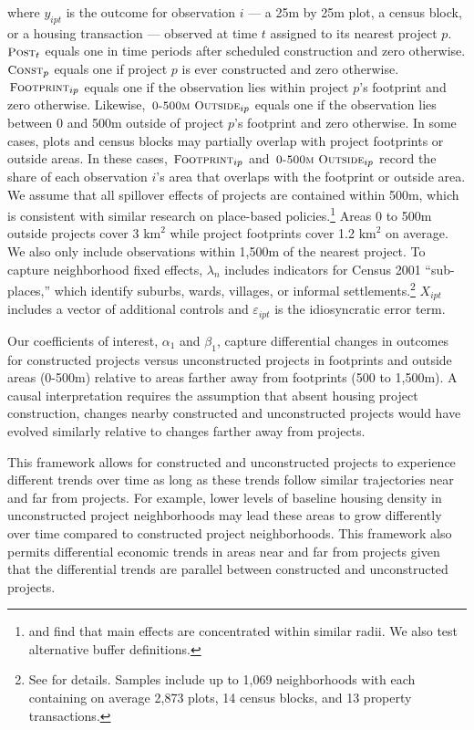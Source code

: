 \documentclass[12pt]{article}
\begin{document}
\noindent where $y_{ipt}$ is the outcome for observation $i$ --- a 25m by 25m plot, a census block, or a housing transaction --- observed at time $t$ assigned to its nearest project $p$.  $\textsc{\small Post}_{t}$ equals one in time periods after scheduled construction and zero otherwise.  $\textsc{\small Const}_{p}$ equals one if project $p$ is ever constructed and zero otherwise.  $\,\textsc{\small Footprint}_{ip}$ equals one if the observation lies within project $p$'s footprint and zero otherwise.  Likewise, $\,\textsc{\small 0-500m Outside}_{ip}$ equals one if the observation lies between 0 and 500m outside of project $p$'s footprint and zero otherwise.  In some cases, plots and census blocks may partially overlap with project footprints or outside areas.  In these cases, $\,\textsc{\small Footprint}_{ip}$ and $\,\textsc{\small 0-500m Outside}_{ip}$ record the share of each observation $i$'s area that overlaps with the footprint or outside area.  We assume that all spillover effects of projects are contained within 500m, which is consistent with similar research on place-based policies.\footnote{\cite{diamond2016wants} and \cite{rossi2010housing} find that main effects are concentrated within similar radii.  We also test alternative buffer definitions.}  Areas 0 to 500m outside projects cover 3 $\text{km}^{2}$ while project footprints cover 1.2 $\text{km}^{2}$ on average.  We also only include observations within 1,500m of the nearest project.  To capture neighborhood fixed effects, $\lambda_{n}$ includes indicators for Census 2001 ``sub-places,'' which identify suburbs, wards, villages, or informal settlements.\footnote{See \cite{censusmeta} for details.  Samples include up to 1,069 neighborhoods with each containing on average 2,873 plots, 14 census blocks, and 13 property transactions.}  $X_{ipt}$ includes a vector of additional controls and $\varepsilon_{ipt}$ is the idiosyncratic error term.  



Our coefficients of interest, $\alpha_1$ and $\beta_1$, capture differential changes in outcomes for constructed projects versus unconstructed projects in footprints and outside areas (0-500m) relative to areas farther away from footprints (500 to 1,500m).  A causal interpretation requires the assumption that absent housing project construction, changes nearby constructed and unconstructed projects would have evolved similarly relative to changes farther away from projects.  

This framework allows for constructed and unconstructed projects to experience different trends over time as long as these trends follow similar trajectories near and far from projects.  For example, lower levels of baseline housing density in unconstructed project neighborhoods may lead these areas to grow differently over time compared to constructed project neighborhoods.  This framework also permits differential economic trends in areas near and far from projects given that the differential trends are parallel between constructed and unconstructed projects.  
\end{document}
